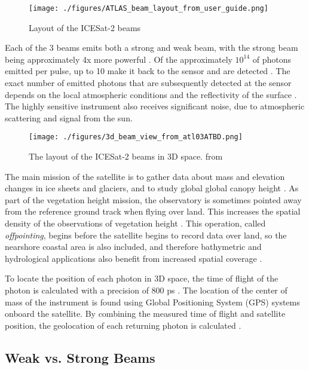 \begin{figure}[h!]
      \centering
      \texttt{[image: ./figures/ATLAS\_beam\_layout\_from\_user\_guide.png]}
      \caption{Layout of the ICESat-2 beams}
      \label{fig:icesat-rgts}
\end{figure}

Each of the 3 beams emits both a strong and weak beam, with the strong beam being approximately 4x more powerful \parencite{Neumann2019d}. Of the approximately \(10^{14}\) of photons emitted per pulse, up to  10 make it back to the sensor and are detected \parencite{Neumann2019d}. The exact number of emitted photons that are subsequently detected at the sensor depends on the local atmospheric conditions and the reflectivity of the surface \parencite{Neumann2019e}. The highly sensitive instrument also receives significant noise, due to atmospheric scattering and signal from the sun.

\begin{figure}[htbp]
      \centering
      \texttt{[image: ./figures/3d\_beam\_view\_from\_atl03ATBD.png]}
      \caption{The layout of the ICESat-2 beams in 3D space. from \cite{Neumann2019d}}
      \label{3d-beams}
\end{figure}


The main mission of the satellite is to gather data about mass and elevation changes in ice sheets and glaciers, and to study global global canopy height \parencite{Markus2017}. As part of the vegetation height mission, the observatory is sometimes pointed away from the reference ground track when flying over land. This increases the spatial density of the observations of vegetation height \parencite{Markus2017}. This operation, called  \emph{offpointing}, begins before the satellite begins to record data over land, so the nearshore coastal area is also included, and therefore bathymetric and hydrological applications also benefit from increased spatial coverage \parencite{Magruder2021}.

To locate the position of each photon in 3D space, the time of flight of the photon is calculated with a precision of 800 ps \parencite{Neumann2019d}. The location of the center of mass of the instrument is found using Global Positioning System (GPS) systems onboard the satellite. By combining the measured time of flight and satellite position, the geolocation of each returning photon is calculated \parencite{Neumann2019d}.

\subsection{Weak vs. Strong Beams}

